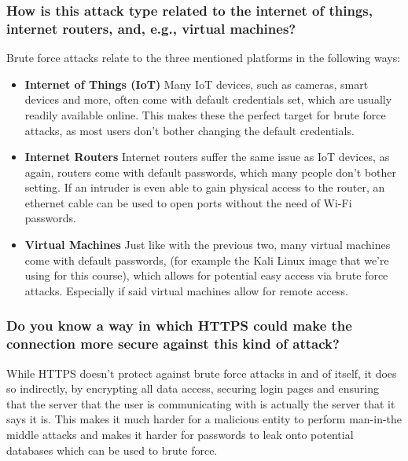 \subsubsection{How is this attack type related to the internet of things,
    internet routers, and, e.g., virtual machines?}
Brute force attacks relate to the three mentioned platforms in the following ways:
\begin{itemize}
    \item
          \textbf{Internet of Things (IoT)}
          Many IoT devices, such as cameras, smart devices and more, often come with default credentials set, which are usually readily available online. This makes these the perfect target for brute force attacks, as most users don't bother changing the default credentials.
    \item
          \textbf{Internet Routers}
          Internet routers suffer the same issue as IoT devices, as again, routers come with default passwords, which many people don't bother setting. If an intruder is even able to gain physical access to the router, an ethernet cable can be used to open ports without the need of Wi-Fi passwords.
    \item
          \textbf{Virtual Machines}
          Just like with the previous two, many virtual machines come with default passwords, (for example the Kali Linux image that we're using for this course), which allows for potential easy access via brute force attacks. Especially if said virtual machines allow for remote access.
\end{itemize}
\subsubsection{Do you know a way in which HTTPS could make the
    connection more secure against this kind of attack?}
While HTTPS doesn't protect against brute force attacks in and of itself, it does so indirectly, by encrypting all data access, securing login pages and ensuring that the server that the user is communicating with is actually the server that it says it is. This makes it much harder for a malicious entity to perform man-in-the middle attacks and makes it harder for passwords to leak onto potential databases which can be used to brute force.